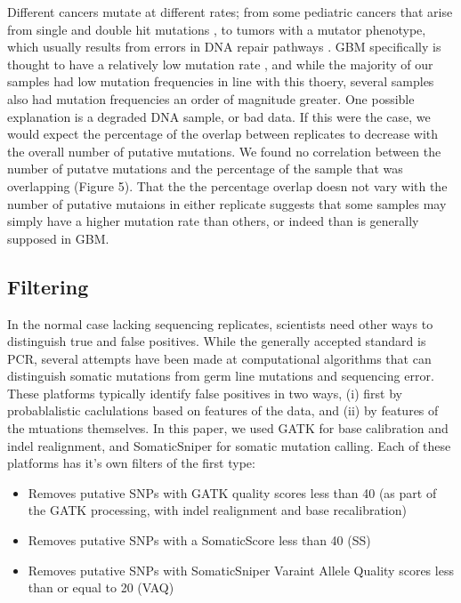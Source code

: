 \documentclass[11pt]{article} %
\begin{document}
Different cancers mutate at different rates; from some pediatric cancers that arise from single and double hit mutations \cite{pediatric}, to tumors with a mutator phenotype, which usually results from errors in DNA repair pathways \cite{mutator}. GBM specifically is thought to have a relatively low mutation rate \cite{GBM_mut_rate}, and while the majority of our samples had low mutation frequencies in line with this thoery, several samples also had mutation frequencies an order of magnitude greater. One possible explanation is a degraded DNA sample, or bad data. If this were the case, we would expect the percentage of the overlap between replicates to decrease with the overall number of putative mutations. We found no correlation between the number of putatve mutations and the percentage of the sample that was overlapping (Figure 5). That the the percentage overlap doesn not vary with the number of putative mutaions in either replicate suggests that some samples may simply have a higher mutation rate than others, or indeed than is generally supposed in GBM.

\subsection{Filtering}

In the normal case lacking sequencing replicates, scientists need other ways to distinguish true and false positives. While the generally accepted standard is PCR, several attempts have been made at computational algorithms that can distinguish somatic mutations from germ line mutations and sequencing error. These platforms typically identify false positives in two ways, (i) first by probablalistic caclulations based on features of the data, and (ii) by features of the mtuations themselves. In this paper, we used GATK for base calibration and indel realignment, and SomaticSniper for somatic mutation calling. Each of these platforms has it's own filters of the first type:

\begin{itemize}
	\item Removes putative SNPs with GATK quality scores less than 40 (as part of the GATK processing, with indel realignment and base recalibration)
	\item Removes putative SNPs with a SomaticScore less than 40 (SS)
	\item Removes putative SNPs with SomaticSniper Varaint Allele Quality scores less than or equal to 20 (VAQ)
\end{itemize}
\end{document}
